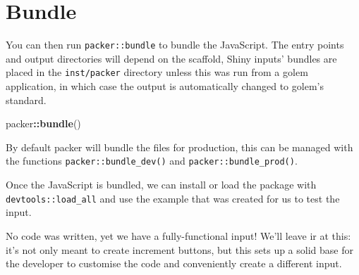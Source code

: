 \documentclass[10pt,]{krantz}
\makeatletter
\newenvironment{Shaded}{\begin{snugshade}}{\end{snugshade}}
\newcommand{\ControlFlowTok}[1]{\textcolor[rgb]{0.27,0.27,0.27}{\textbf{#1}}}
\newcommand{\DecValTok}[1]{\textcolor[rgb]{0.06,0.06,0.06}{#1}}
\newcommand{\KeywordTok}[1]{\textcolor[rgb]{0.27,0.27,0.27}{\textbf{#1}}}
\newcommand{\NormalTok}[1]{#1}
\newcommand{\OperatorTok}[1]{\textcolor[rgb]{0.43,0.43,0.43}{\textbf{#1}}}
\newcommand{\StringTok}[1]{\textcolor[rgb]{0.5,0.5,0.5}{#1}}
\newenvironment{kframe}{%
\medskip{}
\setlength{\fboxsep}{.8em}
 \def\at@end@of@kframe{}%
 \ifinner\ifhmode%
  \def\at@end@of@kframe{\end{minipage}}%
  \begin{minipage}{\columnwidth}%
 \fi\fi%
 \def\FrameCommand##1{\hskip\@totalleftmargin \hskip-\fboxsep
 \colorbox{shadecolor}{##1}\hskip-\fboxsep
     \hskip-\linewidth \hskip-\@totalleftmargin \hskip\columnwidth}%
 \MakeFramed {\advance\hsize-\width
   \@totalleftmargin\z@ \linewidth\hsize
   \@setminipage}}%
 {\par\unskip\endMakeFramed%
 \at@end@of@kframe}
\renewenvironment{Shaded}{\begin{kframe}}{\end{kframe}}
\makeatother
\begin{document}
\hypertarget{packer-bundle}{%
\section{Bundle}\label{packer-bundle}}

You can then run \texttt{packer::bundle} to bundle the JavaScript. The entry points and output directories will depend on the scaffold, Shiny inputs' bundles are placed in the \texttt{inst/packer} directory unless this was run from a golem application, in which case the output is automatically changed to golem's standard.

\begin{Shaded}
\begin{Highlighting}[]
\NormalTok{packer}\OperatorTok{::}\KeywordTok{bundle}\NormalTok{()}
\end{Highlighting}
\end{Shaded}

By default packer will bundle the files for production, this can be managed with the functions \texttt{packer::bundle\_dev()} and \texttt{packer::bundle\_prod()}.

Once the JavaScript is bundled, we can install or load the package with \texttt{devtools::load\_all} and use the example that was created for us to test the input.

\begin{Shaded}
\end{Shaded}

No code was written, yet we have a fully-functional input! We'll leave ir at this: it's not only meant to create increment buttons, but this sets up a solid base for the developer to customise the code and conveniently create a different input.
\end{document}
